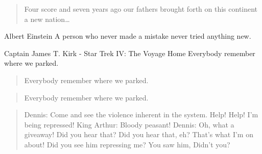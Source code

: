 \begin{quote}
Four score and seven years ago our fathers brought forth
on this continent a new nation…​
\end{quote}

\begin{aquote}{Albert Einstein}{}
A person who never made a mistake never tried anything new.
\end{aquote}

\begin{aquote}{Captain James T. Kirk}{ - Star Trek IV: The Voyage Home}
Everybody remember where we parked.
\end{aquote}

\begin{quote}
Everybody remember where we parked.
\end{quote}

\begin{quote}
Everybody remember where we parked.
\end{quote}

\begin{quote}
Dennis: Come and see the violence inherent in the system. Help! Help! I’m being repressed!
King Arthur: Bloody peasant!
Dennis: Oh, what a giveaway! Did you hear that? Did you hear that, eh? That’s what I’m on about! Did you see him repressing me? You saw him, Didn’t you?
\end{quote}
